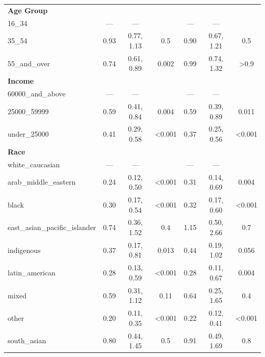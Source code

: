 \documentclass[
  letterpaper,
  DIV=11,
  numbers=noendperiod]{scrartcl}
\begin{document}
\begin{longtable}{lcccccc}
\endfoot
\bottomrule
\endlastfoot
\textbf{Age Group} &  &  &  &  &  & \\
\hspace{1em}16\_34 & — & — &  & — & — & \\
\hspace{1em}35\_54 & 0.93 & 0.77, 1.13 & 0.5 & 0.90 & 0.67, 1.21 & 0.5\\
\hspace{1em}55\_and\_over & 0.74 & 0.61, 0.89 & 0.002 & 0.99 & 0.74, 1.32 & >0.9\\
\textbf{Income} &  &  &  &  &  & \\
\hspace{1em}60000\_and\_above & — & — &  & — & — & \\
\hspace{1em}25000\_59999 & 0.59 & 0.41, 0.84 & 0.004 & 0.59 & 0.39, 0.89 & 0.011\\
\hspace{1em}under\_25000 & 0.41 & 0.29, 0.58 & <0.001 & 0.37 & 0.25, 0.56 & <0.001\\
\textbf{Race} &  &  &  &  &  & \\
\hspace{1em}white\_caucasian & — & — &  & — & — & \\
\hspace{1em}arab\_middle\_eastern & 0.24 & 0.12, 0.50 & <0.001 & 0.31 & 0.14, 0.69 & 0.004\\
\hspace{1em}black & 0.30 & 0.17, 0.54 & <0.001 & 0.32 & 0.17, 0.60 & <0.001\\
\hspace{1em}east\_asian\_pacific\_islander & 0.74 & 0.36, 1.52 & 0.4 & 1.15 & 0.50, 2.66 & 0.7\\
\hspace{1em}indigenous & 0.37 & 0.17, 0.81 & 0.013 & 0.44 & 0.19, 1.02 & 0.056\\
\hspace{1em}latin\_american & 0.28 & 0.13, 0.59 & <0.001 & 0.28 & 0.11, 0.67 & 0.004\\
\hspace{1em}mixed & 0.59 & 0.31, 1.12 & 0.11 & 0.64 & 0.25, 1.65 & 0.4\\
\hspace{1em}other & 0.20 & 0.11, 0.35 & <0.001 & 0.22 & 0.12, 0.41 & <0.001\\
\hspace{1em}south\_asian & 0.80 & 0.44, 1.45 & 0.5 & 0.91 & 0.49, 1.69 & 0.8\\

\end{longtable}
\end{document}
